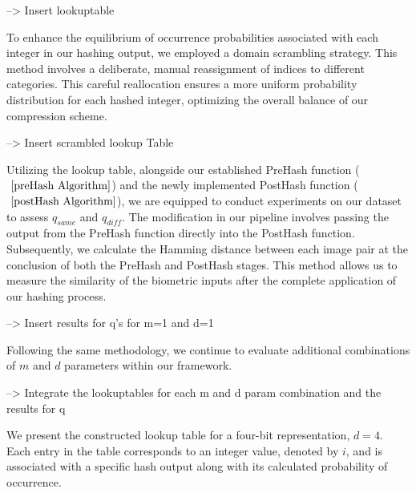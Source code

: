 --> Insert lookuptable

To enhance the equilibrium of occurrence probabilities associated with each integer in our hashing output, we employed a domain scrambling strategy. This method involves a deliberate, manual reassignment of indices to different categories. This careful reallocation ensures a more uniform probability distribution for each hashed integer, optimizing the overall balance of our compression scheme. 

--> Insert scrambled lookup Table

Utilizing the lookup table, alongside our established PreHash function (\(~\ref{preHash Algorithm}\)) and the newly implemented PostHash function (\(~\ref{postHash Algorithm}\)), we are equipped to conduct experiments on our dataset to assess \(q_{same}\) and \(q_{diff}\). The modification in our pipeline involves passing the output from the PreHash function directly into the PostHash function. Subsequently, we calculate the Hamming distance between each image pair at the conclusion of both the PreHash and PostHash stages. This method allows us to measure the similarity of the biometric inputs after the complete application of our hashing process.

--> Insert results for q's for m=1 and d=1


Following the same methodology, we continue to evaluate additional combinations of \(m\) and \(d\) parameters within our framework.

--> Integrate the lookuptables for each m and d param combination and the results for q

We present the constructed lookup table for a four-bit representation, \(d=4\). Each entry in the table corresponds to an integer value, denoted by \(i\), and is associated with a specific hash output along with its calculated probability of occurrence.

